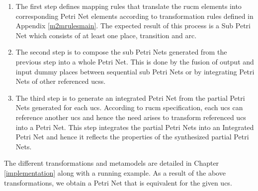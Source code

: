 \begin{enumerate}
\item The first step defines mapping rules that translate the \gls{rucm} elements into corresponding Petri Net elements according to transformation rules defined in Appendix \ref{m2mrulesmain}. The expected result of this process is a Sub Petri Net which consists of at least one place, transition and arc.
\item The second step is to compose the sub Petri Nets generated from the previous step into a whole Petri Net. This is done by the fusion of output and input dummy places between sequential sub Petri Nets or by integrating Petri Nets of other referenced \glspl{ucs}.
\item The third step is to generate an integrated Petri Net from the partial Petri Nets generated for each \gls{ucs}. According to \gls{rucm} specification, each \gls{ucs} can reference another \gls{ucs} and hence the need arises to transform referenced \gls{ucs} into a Petri Net. This step integrates the partial Petri Nets into an Integrated Petri Net and hence it reflects the properties of the synthesized partial Petri Nets.
\end{enumerate}



The different transformations and metamodels are detailed in Chapter \ref{implementation} along with a running example. As a result of the above transformations, we obtain a Petri Net that is equivalent for the given \gls{ucs}.

